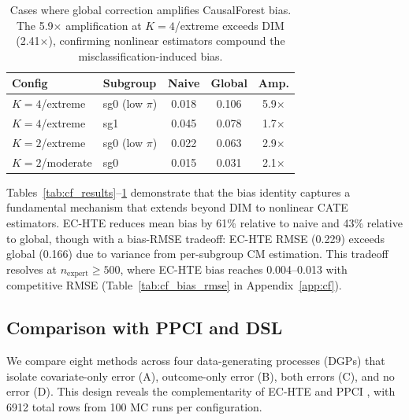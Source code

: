 \documentclass[11pt,twocolumn]{article}
\begin{document}
\begin{table}[t]
\centering
\caption{Cases where global correction amplifies CausalForest bias. The 5.9$\times$ amplification at $K\!=\!4$/extreme exceeds DIM (2.41$\times$), confirming nonlinear estimators compound the misclassification-induced bias.}
\label{tab:cf_hurts}
\small
\begin{tabular}{@{}llccc@{}}
\toprule
Config & Subgroup & Naive & Global & Amp. \\
\midrule
$K\!=\!4$/extreme & sg0 (low $\pi$) & 0.018 & 0.106 & 5.9$\times$ \\
$K\!=\!4$/extreme & sg1 & 0.045 & 0.078 & 1.7$\times$ \\
$K\!=\!2$/extreme & sg0 (low $\pi$) & 0.022 & 0.063 & 2.9$\times$ \\
$K\!=\!2$/moderate & sg0 & 0.015 & 0.031 & 2.1$\times$ \\
\bottomrule
\end{tabular}
\end{table}

Tables~\ref{tab:cf_results}--\ref{tab:cf_hurts} demonstrate that the bias identity captures a fundamental mechanism that extends beyond DIM to nonlinear CATE estimators. EC-HTE reduces mean bias by 61\% relative to naive and 43\% relative to global, though with a bias-RMSE tradeoff: EC-HTE RMSE (0.229) exceeds global (0.166) due to variance from per-subgroup CM estimation. This tradeoff resolves at $n_{\text{expert}} \geq 500$, where EC-HTE bias reaches 0.004--0.013 with competitive RMSE (Table~\ref{tab:cf_bias_rmse} in Appendix~\ref{app:cf}).

\subsection{Comparison with PPCI and DSL}
\label{sec:ppci_exp}

We compare eight methods across four data-generating processes (DGPs) that isolate covariate-only error (A), outcome-only error (B), both errors (C), and no error (D). This design reveals the complementarity of EC-HTE and PPCI \cite{sui2026}, with 6912 total rows from 100 MC runs per configuration.
\end{document}
